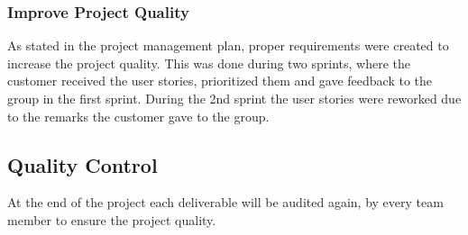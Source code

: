 \subsubsection{Improve Project Quality}
As stated in the project management plan, proper requirements were created to increase the project quality. This was done during two sprints, where the customer received the user stories, prioritized them and gave feedback to the group in the first sprint. During the 2nd sprint the user stories were reworked due to the remarks the customer gave to the group.
\subsection{Quality Control}
At the end of the project each deliverable will be audited again, by every team member to ensure the project quality.
